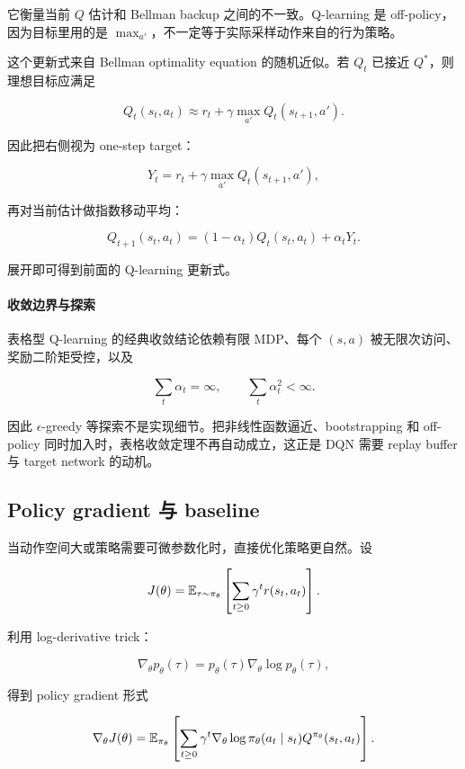 它衡量当前 \(Q\) 估计和 Bellman backup 之间的不一致。Q-learning 是 off-policy，因为目标里用的是 \(\max_{a'}\)，不一定等于实际采样动作来自的行为策略。

这个更新式来自 Bellman optimality equation 的随机近似。若 \(Q_t\) 已接近 \(Q^*\)，则理想目标应满足

\[
  Q_t(s_t,a_t)
  \approx
  r_t+\gamma\max_{a'}Q_t(s_{t+1},a').
\]

因此把右侧视为 one-step target：

\[
  Y_t=r_t+\gamma\max_{a'}Q_t(s_{t+1},a'),
\]

再对当前估计做指数移动平均：

\[
  Q_{t+1}(s_t,a_t)
  =
  (1-\alpha_t)Q_t(s_t,a_t)+\alpha_tY_t.
\]

展开即可得到前面的 Q-learning 更新式。

\paragraph{收敛边界与探索}

表格型 Q-learning 的经典收敛结论依赖有限 MDP、每个 \((s,a)\) 被无限次访问、奖励二阶矩受控，以及

\[
  \sum_t\alpha_t=\infty,
  \qquad
  \sum_t\alpha_t^2<\infty.
\]

因此 \(\epsilon\)-greedy 等探索不是实现细节。把非线性函数逼近、bootstrapping 和 off-policy 同时加入时，表格收敛定理不再自动成立，这正是 DQN 需要 replay buffer 与 target network 的动机。

\subsection{Policy gradient 与 baseline}


当动作空间大或策略需要可微参数化时，直接优化策略更自然。设

\[
  J(\theta)=\mathbb{E}_{\tau\sim\pi_\theta}\left[\sum_{t\ge0}\gamma^t r(s_t,a_t)\right].
\]

利用 log-derivative trick：

\[
  \nabla_\theta p_\theta(\tau)
  =
  p_\theta(\tau)\nabla_\theta\log p_\theta(\tau),
\]

得到 policy gradient 形式

\[
  \nabla_\theta J(\theta)
  =
  \mathbb{E}_{\pi_\theta}
  \left[
    \sum_{t\ge0}
    \gamma^t
    \nabla_\theta\log\pi_\theta(a_t\mid s_t)
    Q^{\pi_\theta}(s_t,a_t)
  \right].
\]

